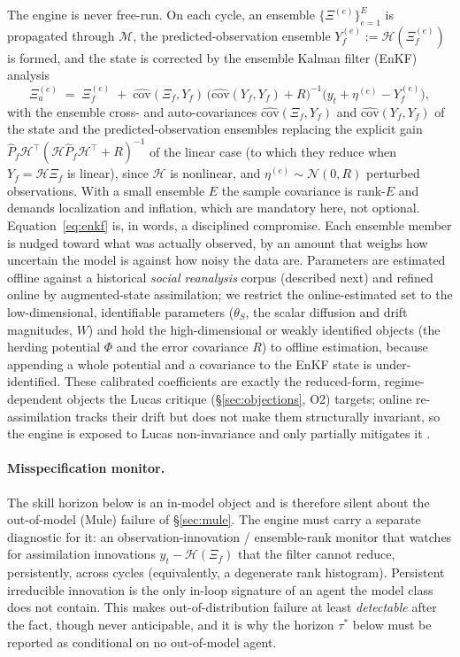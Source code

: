 \documentclass[11pt]{article}
\begin{document}
The engine is never free-run. On each cycle, an ensemble $\{\Xi^{(e)}\}_{e=1}^{E}$ is propagated through $\mathcal{M}$, the predicted-observation ensemble $Y_f^{(e)} := \mathcal{H}(\Xi_f^{(e)})$ is formed, and the state is corrected by the ensemble Kalman filter (EnKF) analysis
\begin{equation}
\Xi^{(e)}_a \;=\; \Xi^{(e)}_f \;+\; \widehat{\mathrm{cov}}(\Xi_f,Y_f)\,\big(\widehat{\mathrm{cov}}(Y_f,Y_f) + R\big)^{-1}\big(y_t + \eta^{(e)} - Y_f^{(e)}\big),
\label{eq:enkf}
\end{equation}
with the ensemble cross- and auto-covariances $\widehat{\mathrm{cov}}(\Xi_f,Y_f)$ and $\widehat{\mathrm{cov}}(Y_f,Y_f)$ of the state and the predicted-observation ensembles replacing the explicit gain $\hat P_f \mathcal{H}^\top(\mathcal{H}\hat P_f \mathcal{H}^\top + R)^{-1}$ of the linear case (to which they reduce when $Y_f=\mathcal{H}\Xi_f$ is linear), since $\mathcal{H}$ is nonlinear, and $\eta^{(e)} \sim \mathcal{N}(0,R)$ perturbed observations. With a small ensemble $E$ the sample covariance is rank-$E$ and demands localization and inflation, which are mandatory here, not optional. Equation~\eqref{eq:enkf} is, in words, a disciplined compromise. Each ensemble member is nudged toward what was actually observed, by an amount that weighs how uncertain the model is against how noisy the data are. Parameters are estimated offline against a historical \emph{social reanalysis} corpus (described next) and refined online by augmented-state assimilation; we restrict the online-estimated set to the low-dimensional, identifiable parameters ($\theta_S$, the scalar diffusion and drift magnitudes, $W$) and hold the high-dimensional or weakly identified objects (the herding potential $\Phi$ and the error covariance $R$) to offline estimation, because appending a whole potential and a covariance to the EnKF state is under-identified. These calibrated coefficients are exactly the reduced-form, regime-dependent objects the Lucas critique (\S\ref{sec:objections}, O2) targets; online re-assimilation tracks their drift but does not make them structurally invariant, so the engine is exposed to Lucas non-invariance and only partially mitigates it \cite{hansensargent2008}.

\paragraph{Misspecification monitor.} The skill horizon below is an in-model object and is therefore silent about the out-of-model (Mule) failure of \S\ref{sec:mule}. The engine must carry a separate diagnostic for it: an observation-innovation / ensemble-rank monitor that watches for assimilation innovations $y_t - \mathcal{H}(\Xi_f)$ that the filter cannot reduce, persistently, across cycles (equivalently, a degenerate rank histogram). Persistent irreducible innovation is the only in-loop signature of an agent the model class does not contain. This makes out-of-distribution failure at least \emph{detectable} after the fact, though never anticipable, and it is why the horizon $\tau^\ast$ below must be reported as conditional on no out-of-model agent.
\end{document}
